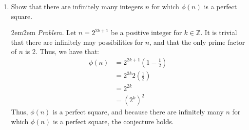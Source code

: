 \documentclass[10pt,oneside]{book}
\newcommand{\Z}{\mathbb{Z}}\newcommand{\R}{\mathbb{R}}\newcommand{\N}{\mathbb{N}}
\newcommand{\gspc}{\vspace{0.13cm}} %
\let\endoldproof\endproof
\newenvironment{problem}[1]
  {\vspace{-0.1cm}\begin{coloredadjust}\begin{adjustwidth}{2em}{2em}
   \textit{Problem. }#1}
  {\endoldproof
\end{adjustwidth}\end{coloredadjust}\gspc}
\begin{document}
\begin{enumerate}
\begin{enumerate}
\begin{problem}
\begin{align*}
				&= n(1-\frac{1}{p_1})\cdots\\
				2\phi(n) &= 2\phi(2k)\\
				&= 2(2k)(1-\frac{1}2)(1-\frac{1}{p_1})\cdots\\
				&= n(1-\frac{1}{p_1})\cdots
			\end{align*}
			Thus, $\phi(2n) = 2\phi(n)$. 
		\end{problem}
	\end{enumerate}
	\pagebreak
	\item [6.] Show that there are infinitely many integers $n$ for which $\phi(n)$ is a perfect square. 
	\begin{problem}
		Let $n = 2^{2k+1}$ be a positive integer for $k\in\Z$. It is trivial that there are infinitely may possibilities for $n$, and that the only prime factor of $n$ is 2. Thus, we have that:
		\begin{align*}
			\phi(n) &= 2^{2k+1}(1-\frac{1}2)\\
			&= 2^{2k}2(\frac{1}2)\\
			&= 2^{2k}\\
			&= (2^k)^2
		\end{align*}
		Thus, $\phi(n)$ is a perfect square, and because there are infinitely many $n$ for which $\phi(n)$ is a perfect square, the conjecture holds. 
	\end{problem}
\end{enumerate}
\end{document}
